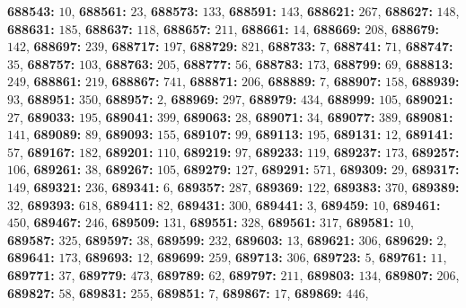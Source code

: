 \textsf{\bfseries 688543:} $10$, \textsf{\bfseries 688561:} $23$, \textsf{\bfseries 688573:} $133$, \textsf{\bfseries 688591:} $143$, \textsf{\bfseries 688621:} $267$, \textsf{\bfseries 688627:} $148$, \textsf{\bfseries 688631:} $185$, \textsf{\bfseries 688637:} $118$, \textsf{\bfseries 688657:} $211$, \textsf{\bfseries 688661:} $14$, \textsf{\bfseries 688669:} $208$, \textsf{\bfseries 688679:} $142$, \textsf{\bfseries 688697:} $239$, \textsf{\bfseries 688717:} $197$, \textsf{\bfseries 688729:} $821$, \textsf{\bfseries 688733:} $7$, \textsf{\bfseries 688741:} $71$, \textsf{\bfseries 688747:} $35$, \textsf{\bfseries 688757:} $103$, \textsf{\bfseries 688763:} $205$, \textsf{\bfseries 688777:} $56$, \textsf{\bfseries 688783:} $173$, \textsf{\bfseries 688799:} $69$, \textsf{\bfseries 688813:} $249$, \textsf{\bfseries 688861:} $219$, \textsf{\bfseries 688867:} $741$, \textsf{\bfseries 688871:} $206$, \textsf{\bfseries 688889:} $7$, \textsf{\bfseries 688907:} $158$, \textsf{\bfseries 688939:} $93$, \textsf{\bfseries 688951:} $350$, \textsf{\bfseries 688957:} $2$, \textsf{\bfseries 688969:} $297$, \textsf{\bfseries 688979:} $434$, \textsf{\bfseries 688999:} $105$, \textsf{\bfseries 689021:} $27$, \textsf{\bfseries 689033:} $195$, \textsf{\bfseries 689041:} $399$, \textsf{\bfseries 689063:} $28$, \textsf{\bfseries 689071:} $34$, \textsf{\bfseries 689077:} $389$, \textsf{\bfseries 689081:} $141$, \textsf{\bfseries 689089:} $89$, \textsf{\bfseries 689093:} $155$, \textsf{\bfseries 689107:} $99$, \textsf{\bfseries 689113:} $195$, \textsf{\bfseries 689131:} $12$, \textsf{\bfseries 689141:} $57$, \textsf{\bfseries 689167:} $182$, \textsf{\bfseries 689201:} $110$, \textsf{\bfseries 689219:} $97$, \textsf{\bfseries 689233:} $119$, \textsf{\bfseries 689237:} $173$, \textsf{\bfseries 689257:} $106$, \textsf{\bfseries 689261:} $38$, \textsf{\bfseries 689267:} $105$, \textsf{\bfseries 689279:} $127$, \textsf{\bfseries 689291:} $571$, \textsf{\bfseries 689309:} $29$, \textsf{\bfseries 689317:} $149$, \textsf{\bfseries 689321:} $236$, \textsf{\bfseries 689341:} $6$, \textsf{\bfseries 689357:} $287$, \textsf{\bfseries 689369:} $122$, \textsf{\bfseries 689383:} $370$, \textsf{\bfseries 689389:} $32$, \textsf{\bfseries 689393:} $618$, \textsf{\bfseries 689411:} $82$, \textsf{\bfseries 689431:} $300$, \textsf{\bfseries 689441:} $3$, \textsf{\bfseries 689459:} $10$, \textsf{\bfseries 689461:} $450$, \textsf{\bfseries 689467:} $246$, \textsf{\bfseries 689509:} $131$, \textsf{\bfseries 689551:} $328$, \textsf{\bfseries 689561:} $317$, \textsf{\bfseries 689581:} $10$, \textsf{\bfseries 689587:} $325$, \textsf{\bfseries 689597:} $38$, \textsf{\bfseries 689599:} $232$, \textsf{\bfseries 689603:} $13$, \textsf{\bfseries 689621:} $306$, \textsf{\bfseries 689629:} $2$, \textsf{\bfseries 689641:} $173$, \textsf{\bfseries 689693:} $12$, \textsf{\bfseries 689699:} $259$, \textsf{\bfseries 689713:} $306$, \textsf{\bfseries 689723:} $5$, \textsf{\bfseries 689761:} $11$, \textsf{\bfseries 689771:} $37$, \textsf{\bfseries 689779:} $473$, \textsf{\bfseries 689789:} $62$, \textsf{\bfseries 689797:} $211$, \textsf{\bfseries 689803:} $134$, \textsf{\bfseries 689807:} $206$, \textsf{\bfseries 689827:} $58$, \textsf{\bfseries 689831:} $255$, \textsf{\bfseries 689851:} $7$, \textsf{\bfseries 689867:} $17$, \textsf{\bfseries 689869:} $446$, 
